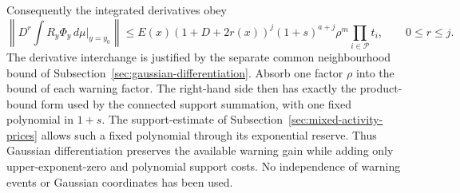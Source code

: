 Consequently the integrated derivatives obey
\begin{equation}\label{eq:moment-final-price}
 \left\|D^r\int R_y\Phi_y\,d\mu\bigg|_{y=y_0}\right\|
 \le E(x)(1+D+2r(x))^j(1+s)^{a+j}
               \rho^m\prod_{i\in\mathcal P}t_i,
 \qquad 0\le r\le j.
\end{equation}
The derivative interchange is justified by the separate common
neighbourhood bound of
Subsection~\ref{sec:gaussian-differentiation}. Absorb one factor
$\rho$ into the bound of each warning factor. The right-hand side
then has exactly the product-bound form used by the connected
support summation, with one fixed polynomial in $1+s$. The
support-estimate of Subsection~\ref{sec:mixed-activity-prices}
allows such a fixed polynomial through its exponential reserve.
Thus Gaussian differentiation preserves the available warning
gain while adding only upper-exponent-zero and polynomial support
costs. No independence of warning events or Gaussian coordinates
has been used.
